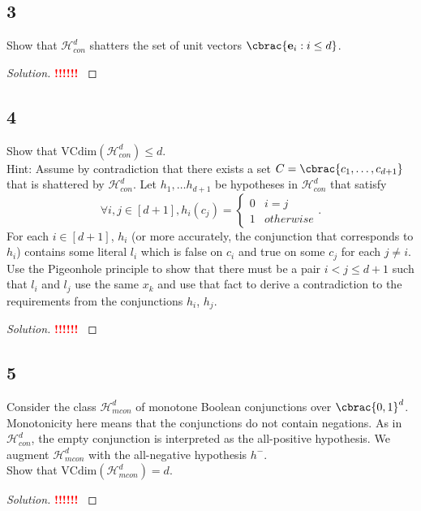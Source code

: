 \documentclass[10pt, a4paper, twoside]{amsart}
\DeclarePairedDelimiter\cbrac\{\}
\newcommand{\cH}{\ensuremath{\mathcal{H}}}
\newenvironment{solution}
               {\let\oldqedsymbol=\qedsymbol
                \renewcommand{\qedsymbol}{$\blacktriangleleft$}
                \begin{proof}[Solution]}
               {\end{proof}
                \renewcommand{\qedsymbol}{\oldqedsymbol}}
\newcommand{\TODO}{\textcolor{red}{\textbf{!!!!!! }}}
\begin{document}
\subsection*{3}
Show that $\cH^d_{con}$ shatters the set of unit vectors $\cbrac{\mathbf{e}_i:i \leq d}$.
\begin{solution}
\TODO
\end{solution}
\subsection*{4}
Show that $\text{VCdim}(\cH_{con}^d) \leq d$.\\
Hint: Assume by contradiction that there exists a set $C = \cbrac{c_1, \ldots , c_{d+1}}$ that is shattered by $\cH^d_{con}$. Let $h_1, \ldots h_{d+1}$ be hypotheses in $\cH^d_{con}$ that satisfy
\begin{equation*}
  \forall i,j \in [d+1], h_i(c_j) = \begin{cases} 0 & i=j \\
    1 & otherwise\end{cases}.
\end{equation*}
For each $i \in [d+1]$, $h_i$ (or more accurately, the conjunction that corresponds to $h_i$) contains some literal $l_i$ which is false on $c_i$ and true on some $c_j$ for each $j \neq i$. Use the Pigeonhole principle to show that there must be a pair $i < j \leq d+1$ such that $l_i$ and $l_j$ use the same $x_k$ and use that fact to derive a contradiction to the requirements from the conjunctions $h_i$, $h_j$.
\begin{solution}
\TODO
\end{solution}
\subsection*{5}
Consider the class $\cH^d_{mcon}$ of monotone Boolean conjunctions over $\cbrac{0,1}^d$. Monotonicity here means that the conjunctions do not contain negations. As in $\cH^d_{con}$, the empty conjunction is interpreted as the all-positive hypothesis. We augment $\cH^d_{mcon}$ with the all-negative hypothesis $h^-$.\\
Show that $\text{VCdim}(\cH_{mcon}^d) = d$.
\begin{solution}
\TODO
\end{solution}
\end{document}
